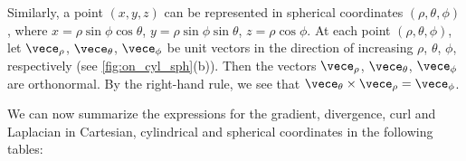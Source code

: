 Similarly, a point $(x,y,z)$ can be represented in spherical coordinates $(\rho, \theta , \phi)$, where $x=\rho\sin \phi \cos \theta$, $y=\rho\sin \phi \sin \theta$, $z=\rho\cos \phi$. At each point $(\rho, \theta , \phi)$, let $\vece_{\rho}$, $\vece_{\theta}$, $\vece_{\phi}$ be unit vectors in the direction of increasing $\rho$, $\theta$, $\phi$, respectively (see \autoref{fig:on_cyl_sph}(b)). Then the vectors $\vece_{\rho}$, $\vece_{\theta}$, $\vece_{\phi}$ are orthonormal. By the right-hand rule, we see that $\vece_{\theta}\times\vece_{\rho}=\vece_{\phi}$.

We can now summarize the expressions for the gradient, divergence, curl and Laplacian in Cartesian, cylindrical and spherical coordinates in the following tables:

\setboxwidth{60pt}

